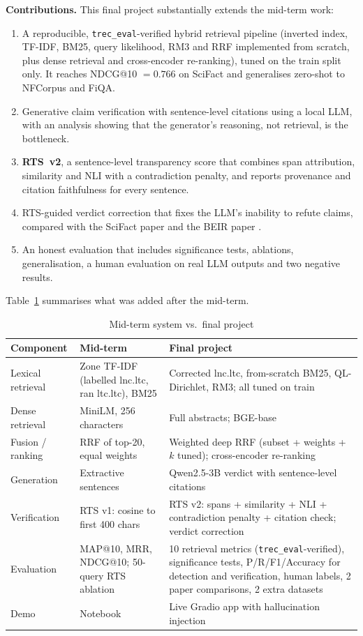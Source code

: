 \documentclass[conference]{IEEEtran}
\begin{document}
\textbf{Contributions.} This final project substantially extends the mid-term work:
\begin{enumerate}
\item A reproducible, \texttt{trec\_eval}-verified hybrid retrieval pipeline (inverted index, TF-IDF, BM25, query
likelihood, RM3 and RRF implemented from scratch, plus dense retrieval and cross-encoder re-ranking), tuned on the train
split only. It reaches NDCG@10 $=0.766$ on SciFact and generalises zero-shot to NFCorpus and FiQA.
\item Generative claim verification with sentence-level citations using a local LLM, with an analysis showing that the
generator's reasoning, not retrieval, is the bottleneck.
\item \textbf{RTS~v2}, a sentence-level transparency score that combines span attribution, similarity and NLI with a
contradiction penalty, and reports provenance and citation faithfulness for every sentence.
\item RTS-guided verdict correction that fixes the LLM's inability to refute claims, compared with the SciFact paper
\cite{wadden2020scifact} and the BEIR paper \cite{thakur2021beir}.
\item An honest evaluation that includes significance tests, ablations, generalisation, a human evaluation on real LLM
outputs and two negative results.
\end{enumerate}
Table~\ref{tab:midterm} summarises what was added after the mid-term.

\begin{table}[t]
\centering
\caption{Mid-term system vs.\ final project}
\label{tab:midterm}
\footnotesize
\begin{tabular}{@{}p{}p{}p{}@{}}
\toprule
Component & Mid-term & Final project \\
\midrule
Lexical retrieval & Zone TF-IDF (labelled lnc.ltc, ran ltc.ltc), BM25 & Corrected lnc.ltc, from-scratch BM25, QL-Dirichlet, RM3; all tuned on train \\
Dense retrieval & MiniLM, 256 characters & Full abstracts; BGE-base \\
Fusion / ranking & RRF of top-20, equal weights & Weighted deep RRF (subset + weights + $k$ tuned); cross-encoder re-ranking \\
Generation & Extractive sentences & Qwen2.5-3B verdict with sentence-level citations \\
Verification & RTS v1: cosine to first 400 chars & RTS v2: spans + similarity + NLI + contradiction penalty + citation check; verdict correction \\
Evaluation & MAP@10, MRR, NDCG@10; 50-query RTS ablation & 10 retrieval metrics (\texttt{trec\_eval}-verified), significance tests, P/R/F1/Accuracy for detection and verification, human labels, 2 paper comparisons, 2 extra datasets \\
Demo & Notebook & Live Gradio app with hallucination injection \\
\bottomrule
\end{tabular}
\end{table}
\end{document}

